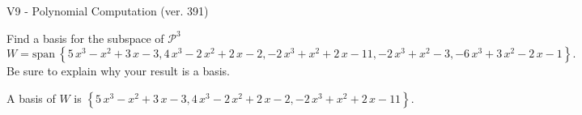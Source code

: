 \begin{exercise}
  \begin{exerciseTitle}V9 - Polynomial Computation (ver. 391)\end{exerciseTitle}
  \begin{exerciseStatement}
    Find a basis for the subspace of \(\mathcal{P}^3\) 
\[W=\mathrm{span}\ \left\{5 \, x^{3} - x^{2} + 3 \, x - 3 , 4 \, x^{3} - 2 \, x^{2} + 2 \, x - 2 , -2 \, x^{3} + x^{2} + 2 \, x - 11 , -2 \, x^{3} + x^{2} - 3 , -6 \, x^{3} + 3 \, x^{2} - 2 \, x - 1\right\}.\]
 Be sure to explain why your result is a basis.


  \end{exerciseStatement}
  \begin{exerciseAnswer}
   A basis of \(W\) is  \(\left\{5 \, x^{3} - x^{2} + 3 \, x - 3 , 4 \, x^{3} - 2 \, x^{2} + 2 \, x - 2 , -2 \, x^{3} + x^{2} + 2 \, x - 11\right\}\).
  


  \end{exerciseAnswer}
\end{exercise}